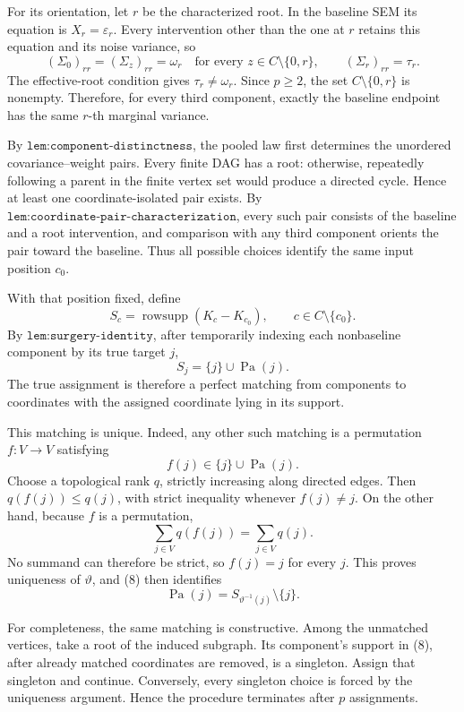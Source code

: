 For its orientation, let \(r\) be the characterized root.  In the
baseline SEM its equation is \(X_r=\varepsilon_r\).  Every intervention
other than the one at \(r\) retains this equation and its noise variance,
so
\[
 (\Sigma_0)_{rr}=(\Sigma_z)_{rr}=\omega_r
 \quad\text{for every }z\in C\setminus\{0,r\},
 \qquad
 (\Sigma_r)_{rr}=\tau_r.
\]
The effective-root condition gives \(\tau_r\neq\omega_r\).  Since
\(p\ge2\), the set \(C\setminus\{0,r\}\) is nonempty.  Therefore, for
every third component, exactly the baseline endpoint has the same
\(r\)-th marginal variance.

By \(\texttt{lem:component-distinctness}\), the pooled law first determines
the unordered covariance--weight pairs.  Every finite DAG has a root:
otherwise, repeatedly following a parent in the finite vertex set would
produce a directed cycle.  Hence at least one coordinate-isolated pair
exists.  By \(\texttt{lem:coordinate-pair-characterization}\), every such
pair consists of the baseline and a root intervention, and comparison
with any third component orients the pair toward the baseline.  Thus all
possible choices identify the same input position \(c_0\).

With that position fixed, define
\[
 S_c=\operatorname{rowsupp}(K_c-K_{c_0}),
 \qquad c\in C\setminus\{c_0\}.
\]
By \(\texttt{lem:surgery-identity}\), after temporarily indexing each
nonbaseline component by its true target \(j\),
\[
 S_j=\{j\}\cup\operatorname{Pa}(j).                                \tag{8}
\]
The true assignment is therefore a perfect matching from components to
coordinates with the assigned coordinate lying in its support.

This matching is unique.  Indeed, any other such matching is a permutation
\(f:V\to V\) satisfying
\[
 f(j)\in\{j\}\cup\operatorname{Pa}(j).
\]
Choose a topological rank \(q\), strictly increasing along directed edges.
Then \(q(f(j))\le q(j)\), with strict inequality whenever \(f(j)\neq j\).
On the other hand, because \(f\) is a permutation,
\[
 \sum_{j\in V}q(f(j))=\sum_{j\in V}q(j).
\]
No summand can therefore be strict, so \(f(j)=j\) for every \(j\).  This
proves uniqueness of \(\vartheta\), and (8) then identifies
\[
 \operatorname{Pa}(j)
 =S_{\vartheta^{-1}(j)}\setminus\{j\}.                              \tag{9}
\]

For completeness, the same matching is constructive.  Among the
unmatched vertices, take a root of the induced subgraph.  Its component's
support in (8), after already matched coordinates are removed, is a
singleton.  Assign that singleton and continue.  Conversely, every
singleton choice is forced by the uniqueness argument.  Hence the
procedure terminates after \(p\) assignments.

